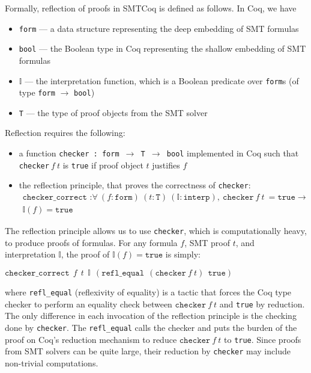 \documentclass{article}
\begin{document}
	Formally, reflection of proofs 
	in SMTCoq is defined as follows. 
	In Coq, we have 
	\begin{itemize}
		\item \texttt{form} --- a data 
		structure representing the deep 
		embedding of SMT formulas
		\item \texttt{bool} --- the 
		Boolean type in Coq 
		representing the shallow 
		embedding of SMT formulas
		\item $\mathbb{I}$ --- the 
		interpretation function, which 
		is a Boolean predicate over 
		\texttt{form}s (of type 
		\texttt{form} $\to$ 
		\texttt{bool})
		\item \texttt{T} --- the type of 
		proof objects from the SMT solver
	\end{itemize}
	Reflection requires the following:
	\begin{itemize}
		\item a function 
		\texttt{checker : form $\to$ T $\to$ 
		bool} implemented in Coq such that 
		\texttt{checker}$\ f\ t$ is 
		\texttt{true} if proof object $t$
		justifies $f$
		\item the reflection principle, that 
		proves the correctness of 
		\texttt{checker}:
		\begin{align*}
			\texttt{checker\_correct :} 
			\forall\ (f : \texttt{form})\ 
			(t : \texttt{T})\ 
			(\mathbb{I} : \texttt{interp}),\ 
			\texttt{checker}\ f\ t\ = 
			\texttt{true} \to \\
			\mathbb{I}(f) = 
			\texttt{true}
		\end{align*}
	\end{itemize}
	The reflection principle allows
	us to use \texttt{checker}, which 
	is computationally heavy, to 
	produce proofs of formulas. For any
	formula $f$, SMT proof $t$, and
	interpretation $\mathbb{I}$,
	the proof of $\mathbb{I}(f) = 
	\texttt{true}$ is simply:
	\begin{center}
		$\texttt{checker\_correct}\ \ 
		f\ \ t\ \ \mathbb{I}\ \ 
		(\texttt{refl\_equal}\ \ 
		(\texttt{checker}\ f\ t)\ \ 
		\texttt{true})$
	\end{center}
	where \texttt{refl\_equal} 
	(reflexivity of equality) is a tactic
	that forces the Coq type checker to 
	perform an equality check between 
	$\texttt{checker}\ f\ t$ and \texttt{true}
	by reduction. The only difference 
	in each invocation of the reflection 
	principle is the checking 
	done by \texttt{checker}. The 
	\texttt{refl\_equal} calls the 
	checker and puts the burden of the 
	proof on Coq's reduction mechanism
	to reduce $\texttt{checker}\ f\ t$
	to \texttt{true}. Since proofs from 
	SMT solvers can be quite large, their
	reduction by \texttt{checker} may
	include non-trivial computations.
	
\end{document}
